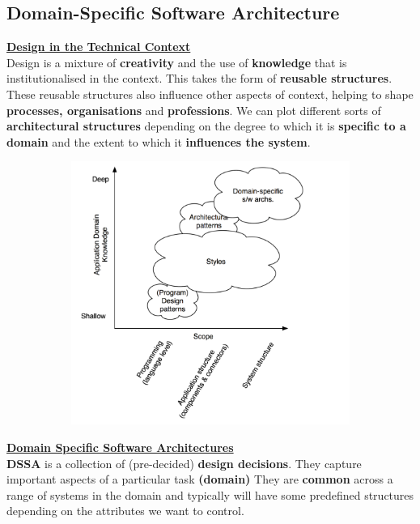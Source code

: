\documentclass[a4paper]{article}
\begin{document}
\subsection{Domain-Specific Software Architecture}

\underline{\textbf{Design in the Technical Context}}\\
Design is a mixture of \textbf{creativity} and the use of \textbf{knowledge} that is institutionalised in the context. This takes the form of \textbf{reusable structures}. These reusable structures also influence other aspects of context, helping to shape \textbf{processes, organisations} and \textbf{professions}. We can plot different sorts of \textbf{architectural structures} depending on the degree to which it is \textbf{specific to a domain} and the extent to which it \textbf{influences the system}.\\

\begin{figure}[H]
\hskip-2.5cm\begin{subfigure}{1\textwidth}
  \includegraphics[width=1\linewidth]
  {images/3-graph.png}
\end{subfigure}
\end{figure}

\underline{\textbf{Domain Specific Software Architectures}}\\
\textbf{DSSA} is a collection of (pre-decided) \textbf{design decisions}. They capture important aspects of a particular task \textbf{(domain)} They are \textbf{common} across a range of systems in the domain and typically will have some predefined structures depending on the attributes we want to control.\\
\end{document}
